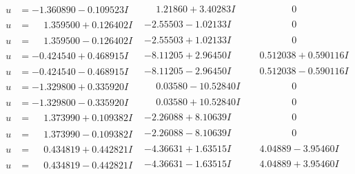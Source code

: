 \documentclass[1p]{elsarticle_modified}
\theoremstyle{definition}
\begin{document}
$$\begin{array}{c|c|c}
\begin{aligned}
u &= -1.360890 - 0.109523 I\end{aligned}
 & \phantom{-}1.21860 + 3.40283 I & \phantom{-0.000000 } 0 \\ \hline\begin{aligned}
u &= \phantom{-}1.359500 + 0.126402 I\end{aligned}
 & -2.55503 - 1.02133 I & \phantom{-0.000000 } 0 \\ \hline\begin{aligned}
u &= \phantom{-}1.359500 - 0.126402 I\end{aligned}
 & -2.55503 + 1.02133 I & \phantom{-0.000000 } 0 \\ \hline\begin{aligned}
u &= -0.424540 + 0.468915 I\end{aligned}
 & -8.11205 + 2.96450 I & \phantom{-}0.512038 + 0.590116 I \\ \hline\begin{aligned}
u &= -0.424540 - 0.468915 I\end{aligned}
 & -8.11205 - 2.96450 I & \phantom{-}0.512038 - 0.590116 I \\ \hline\begin{aligned}
u &= -1.329800 + 0.335920 I\end{aligned}
 & \phantom{-}0.03580 - 10.52840 I & \phantom{-0.000000 } 0 \\ \hline\begin{aligned}
u &= -1.329800 - 0.335920 I\end{aligned}
 & \phantom{-}0.03580 + 10.52840 I & \phantom{-0.000000 } 0 \\ \hline\begin{aligned}
u &= \phantom{-}1.373990 + 0.109382 I\end{aligned}
 & -2.26088 + 8.10639 I & \phantom{-0.000000 } 0 \\ \hline\begin{aligned}
u &= \phantom{-}1.373990 - 0.109382 I\end{aligned}
 & -2.26088 - 8.10639 I & \phantom{-0.000000 } 0 \\ \hline\begin{aligned}
u &= \phantom{-}0.434819 + 0.442821 I\end{aligned}
 & -4.36631 + 1.63515 I & \phantom{-}4.04889 - 3.95460 I \\ \hline\begin{aligned}
u &= \phantom{-}0.434819 - 0.442821 I\end{aligned}
 & -4.36631 - 1.63515 I & \phantom{-}4.04889 + 3.95460 I \\ \hline\begin{aligned}

\end{aligned}
\end{array}$$
\end{document}
